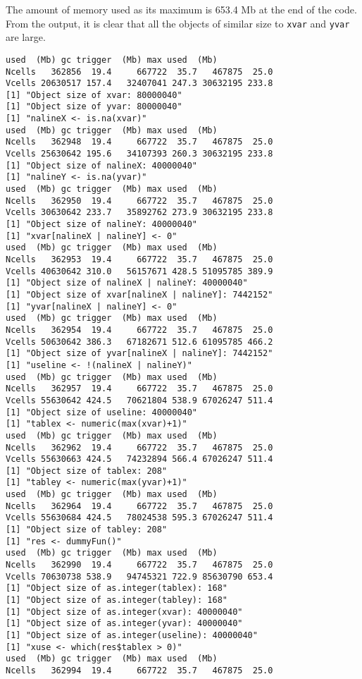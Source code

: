 \documentclass{article}\usepackage[]{graphicx}\usepackage[]{color}
\begin{document}
The amount of memory used as its maximum is 653.4 Mb at the end of the code. From the output, it is clear that all the objects of similar size to \texttt{xvar} and \texttt{yvar} are large.
\begin{verbatim}
used  (Mb) gc trigger  (Mb) max used  (Mb)
Ncells   362856  19.4     667722  35.7   467875  25.0
Vcells 20630517 157.4   32407041 247.3 30632195 233.8
[1] "Object size of xvar: 80000040"
[1] "Object size of yvar: 80000040"
[1] "nalineX <- is.na(xvar)"
used  (Mb) gc trigger  (Mb) max used  (Mb)
Ncells   362948  19.4     667722  35.7   467875  25.0
Vcells 25630642 195.6   34107393 260.3 30632195 233.8
[1] "Object size of nalineX: 40000040"
[1] "nalineY <- is.na(yvar)"
used  (Mb) gc trigger  (Mb) max used  (Mb)
Ncells   362950  19.4     667722  35.7   467875  25.0
Vcells 30630642 233.7   35892762 273.9 30632195 233.8
[1] "Object size of nalineY: 40000040"
[1] "xvar[nalineX | nalineY] <- 0"
used  (Mb) gc trigger  (Mb) max used  (Mb)
Ncells   362953  19.4     667722  35.7   467875  25.0
Vcells 40630642 310.0   56157671 428.5 51095785 389.9
[1] "Object size of nalineX | nalineY: 40000040"
[1] "Object size of xvar[nalineX | nalineY]: 7442152"
[1] "yvar[nalineX | nalineY] <- 0"
used  (Mb) gc trigger  (Mb) max used  (Mb)
Ncells   362954  19.4     667722  35.7   467875  25.0
Vcells 50630642 386.3   67182671 512.6 61095785 466.2
[1] "Object size of yvar[nalineX | nalineY]: 7442152"
[1] "useline <- !(nalineX | nalineY)"
used  (Mb) gc trigger  (Mb) max used  (Mb)
Ncells   362957  19.4     667722  35.7   467875  25.0
Vcells 55630642 424.5   70621804 538.9 67026247 511.4
[1] "Object size of useline: 40000040"
[1] "tablex <- numeric(max(xvar)+1)"
used  (Mb) gc trigger  (Mb) max used  (Mb)
Ncells   362962  19.4     667722  35.7   467875  25.0
Vcells 55630663 424.5   74232894 566.4 67026247 511.4
[1] "Object size of tablex: 208"
[1] "tabley <- numeric(max(yvar)+1)"
used  (Mb) gc trigger  (Mb) max used  (Mb)
Ncells   362964  19.4     667722  35.7   467875  25.0
Vcells 55630684 424.5   78024538 595.3 67026247 511.4
[1] "Object size of tabley: 208"
[1] "res <- dummyFun()"
used  (Mb) gc trigger  (Mb) max used  (Mb)
Ncells   362990  19.4     667722  35.7   467875  25.0
Vcells 70630738 538.9   94745321 722.9 85630790 653.4
[1] "Object size of as.integer(tablex): 168"
[1] "Object size of as.integer(tabley): 168"
[1] "Object size of as.integer(xvar): 40000040"
[1] "Object size of as.integer(yvar): 40000040"
[1] "Object size of as.integer(useline): 40000040"
[1] "xuse <- which(res$tablex > 0)"
used  (Mb) gc trigger  (Mb) max used  (Mb)
Ncells   362994  19.4     667722  35.7   467875  25.0

\end{verbatim}
\end{document}
